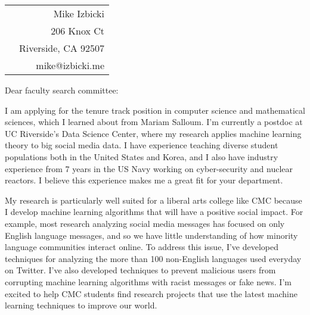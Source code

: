 \documentclass[12pt]{article}
\begin{document}
\noindent
\hspace{-0.13in}
\begin{tabularx}{1.03\textwidth}{Xr}
 & Mike Izbicki \\
 & 206 Knox Ct\\
 & Riverside, CA 92507\\
 & mike@izbicki.me\\
\end{tabularx}

\vspace{0.2in}

\setlength{\parskip}{15pt plus4mm minus3mm}

\noindent
Dear faculty search committee:

\noindent
I am applying for the tenure track position in computer science and mathematical sciences, 
which I learned about from Mariam Salloum.
I'm currently a postdoc at UC Riverside's Data Science Center,
where my research applies machine learning theory to big social media data.
I have experience teaching diverse student populations both in the United States and Korea,
and I also have industry experience from 7 years in the US Navy working on cyber-security and nuclear reactors.
I believe this experience makes me a great fit for your department.

\noindent
My research is particularly well suited for a liberal arts college like CMC because I develop machine learning algorithms that will have a positive social impact.
For example, most research analyzing social media messages has focused on only English language messages,
and so we have little understanding of how minority language communities interact online.
To address this issue, I've developed techniques for analyzing the more than 100 non-English languages used everyday on Twitter.
I've also developed techniques to prevent malicious users from corrupting machine learning algorithms with racist messages or fake news.
I'm excited to help CMC students find research projects that use the latest machine learning techniques to improve our world.
\end{document}
